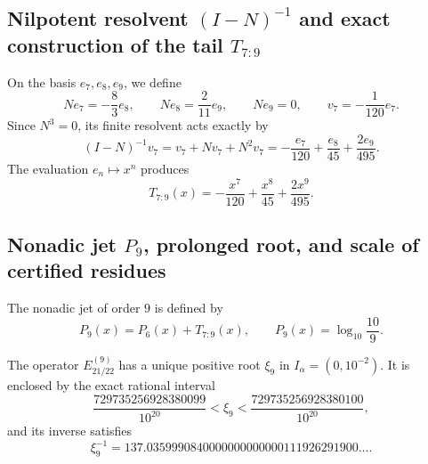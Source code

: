 \subsection{Nilpotent resolvent \texorpdfstring{\((I-N)^{-1}\)}{(I-N)^-1} and exact construction of the tail \texorpdfstring{\(T_{7:9}\)}{T7:9}}
\label{sec:l9s102:alpha-resolvente}

On the basis \(e_7,e_8,e_9\), we define
\begin{equation}
 Ne_7=-\frac83e_8,
 \qquad
 Ne_8=\frac2{11}e_9,
 \qquad
 Ne_9=0,
 \qquad
 v_7=-\frac1{120}e_7.
 \label{eq:l9s102:alpha-nilpotente}
\end{equation}
Since \(N^3=0\), its finite resolvent acts exactly by
\begin{equation}
 (I-N)^{-1}v_7
 =v_7+Nv_7+N^2v_7
 =-\frac{e_7}{120}+\frac{e_8}{45}+\frac{2e_9}{495}.
 \label{eq:l9s102:alpha-resolvente-finito}
\end{equation}
The evaluation \(e_n\mapsto x^n\) produces
\begin{equation}
 \boxed{
 T_{7:9}(x)=-\frac{x^7}{120}+\frac{x^8}{45}
 +\frac{2x^9}{495}.}
 \label{eq:l9s102:alpha-t79}
\end{equation}

\subsection{Nonadic jet \texorpdfstring{\(P_9\)}{P9}, prolonged root, and scale of certified residues}
\label{sec:l9s102:alpha-jet-p9}

The nonadic jet of order \(9\) is defined by
\begin{equation}
 P_9(x)=P_6(x)+T_{7:9}(x),
 \qquad
 P_9(x)=\log_{10}\frac{10}{9}.
 \label{eq:l9s102:alpha-p9}
\end{equation}
\begin{theorem}
\label{thm:l9s102:raiz-p9-unica}
The operator \(E_{21/22}^{(9)}\) has a unique positive root \(\xi_9\) in
\(I_\alpha=(0,10^{-2})\). It is enclosed by the exact rational interval
\begin{equation}
 \frac{729735256928380099}{10^{20}}
 <\xi_9<
 \frac{729735256928380100}{10^{20}},
 \label{eq:l9s102:encierro-raiz-p9}
\end{equation}
and its inverse satisfies
\begin{equation}
 \xi_9^{-1}
 =137.0359990840000000000000111926291900\ldots .
 \label{eq:l9s102:alpha-raíz-p9}
\end{equation}
\end{theorem}

